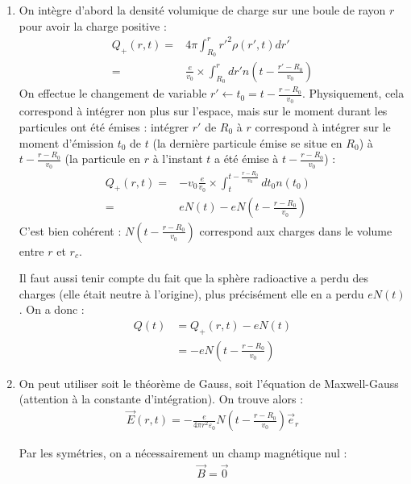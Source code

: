 \begin{correction}
\begin{enumerate}
	\item On intègre d'abord la densité volumique de charge sur une boule de rayon $r$ pour avoir la charge positive :
	\begin{align*}
		Q_+(r,t)=&4\pi\int_{R_0}^r r'^2\rho(r',t)dr' \\
		=& \frac{e}{v_0}\times\int_{R_0}^r dr' n\left(t-\frac{r'-R_0}{v_0} \right) 
	\end{align*}
	On effectue le changement de variable $r'\longleftarrow t_0=t-\frac{r-R_0}{v_0}$. Physiquement, cela correspond à intégrer non plus sur l'espace, mais sur le moment durant les particules ont été émises : intégrer $r'$ de $R_0$ à $r$ correspond à intégrer sur le moment d'émission $t_0$ de $t$ (la dernière particule émise se situe en $R_0$) à $t-\frac{r-R_0}{v_0}$ (la particule en $r$ à l'instant $t$ a été émise à $t-\frac{r-R_0}{v_0}$) :
	\begin{align*}
		Q_+(r,t)=&-v_0\frac{e}{v_0}\times\int_{t}^{t-\frac{r-R_0}{v_0}}dt_0 n\left(t_0\right) \\
		=&eN(t)-eN\left( t-\frac{r-R_0}{v_0}\right) &
	\end{align*}
	C'est bien cohérent : $N\left( t-\frac{r-R_0}{v_0}\right)$ correspond aux charges dans le volume entre $r$ et $r_c$. 
	
	Il faut aussi tenir compte du fait que la sphère radioactive a perdu des charges (elle était neutre à l'origine), plus précisément elle en a perdu $eN(t)$. On a donc :
	\begin{align*}
		Q(t)&=Q_+(r,t)-eN(t)\\
		&=-eN\left( t-\frac{r-R_0}{v_0}\right)		
	\end{align*}
	
	\item On peut utiliser soit le théorème de Gauss, soit l'équation de Maxwell-Gauss (attention à la constante d'intégration). On trouve alors :
	\begin{align*}
		\vec{E}(r,t) = -\frac{e}{4\pi r^2\varepsilon_0}N\left( t-\frac{r-R_0}{v_0}\right)\vec{e}_r
	\end{align*}
	
	Par les symétries, on a nécessairement un champ magnétique nul :
	\begin{align*}
		\vec{B}=\vec{0}
	\end{align*}
	

\end{enumerate}
\end{correction}
